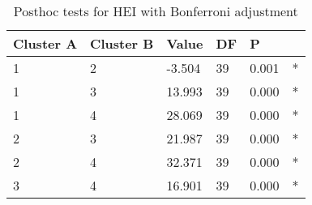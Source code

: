 \begin{table}[h]
\caption{Posthoc tests for HEI with Bonferroni adjustment}
\label{tab:posthoc_HEI}
\begin{tabular}{llllll}
\toprule
Cluster A & Cluster B & Value & DF & P &   \\
\midrule
1 & 2 & -3.504 & 39 & 0.001 & * \\
1 & 3 & 13.993 & 39 & 0.000 & * \\
1 & 4 & 28.069 & 39 & 0.000 & * \\
2 & 3 & 21.987 & 39 & 0.000 & * \\
2 & 4 & 32.371 & 39 & 0.000 & * \\
3 & 4 & 16.901 & 39 & 0.000 & * \\
\bottomrule
\end{tabular}
\end{table}
